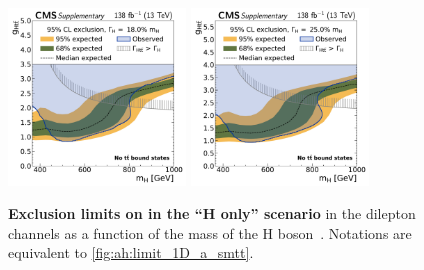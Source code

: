 \begin{figure}[!ph]
    \\
    \includegraphics[width=0.42\textwidth]{figures/ah/lim1D/smtt/ll/H_limit_w18p0_g-scan_highrange.pdf}%
    \hspace*{0.05\textwidth}%
    \includegraphics[width=0.42\textwidth]{figures/ah/lim1D/smtt/ll/H_limit_w25p0_g-scan_highrange.pdf}
    \caption{%
        \textbf{Exclusion limits on \gHtt in the ``H only'' scenario} in the dilepton channels as a function of the mass of the H boson~\cite{CMS:HIG-22-013}. Notations are equivalent to \cref{fig:ah:limit_1D_a_smtt}.
    }
    \label{fig:ah:limit_1D_h_smtt}
\end{figure}

